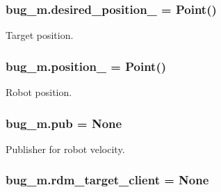 \subsubsection[{\texorpdfstring{desired\+\_\+position\+\_\+}{desired_position_}}]{\setlength{\rightskip}{0pt plus 5cm}bug\+\_\+m.\+desired\+\_\+position\+\_\+ = Point()}\hypertarget{namespacebug__m_a8fb60e35f164091fe3355d3a0bce95af}{}\label{namespacebug__m_a8fb60e35f164091fe3355d3a0bce95af}


Target position. 

\subsubsection[{\texorpdfstring{position\+\_\+}{position_}}]{\setlength{\rightskip}{0pt plus 5cm}bug\+\_\+m.\+position\+\_\+ = Point()}\hypertarget{namespacebug__m_ab108d02234aa3ec58605b9f6980ec090}{}\label{namespacebug__m_ab108d02234aa3ec58605b9f6980ec090}


Robot position. 

\subsubsection[{\texorpdfstring{pub}{pub}}]{\setlength{\rightskip}{0pt plus 5cm}bug\+\_\+m.\+pub = None}\hypertarget{namespacebug__m_adc14150838edf40c8028207cd6bb2082}{}\label{namespacebug__m_adc14150838edf40c8028207cd6bb2082}


Publisher for robot velocity. 

\subsubsection[{\texorpdfstring{rdm\+\_\+target\+\_\+client}{rdm_target_client}}]{\setlength{\rightskip}{0pt plus 5cm}bug\+\_\+m.\+rdm\+\_\+target\+\_\+client = None}\hypertarget{namespacebug__m_aaeea805feba4dc593b505d3935707987}{}\label{namespacebug__m_aaeea805feba4dc593b505d3935707987}


